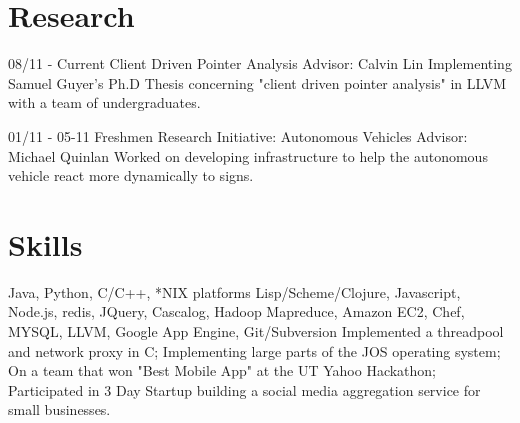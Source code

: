 \documentclass[11pt,letter,sans]{moderncv}
\begin{document}
\section{Research}
\cventry
{08/11 - Current}
{Client Driven Pointer Analysis}
{Advisor: Calvin Lin}
{}
{}
{Implementing Samuel Guyer's Ph.D Thesis concerning "client driven pointer
analysis" in LLVM with a team of undergraduates.}

\cventry
{01/11 - 05-11}
{Freshmen Research Initiative: Autonomous Vehicles}
{Advisor: Michael Quinlan}
{}
{}
{Worked on developing infrastructure to help the autonomous vehicle react more
dynamically to signs.} 

\section{Skills}
{Java, Python, C/C++, *NIX platforms}
{Lisp/Scheme/Clojure, Javascript, Node.js, redis, JQuery, Cascalog, Hadoop Mapreduce,
Amazon EC2, Chef, MYSQL, LLVM, Google App Engine, Git/Subversion }
{Implemented a threadpool and network proxy in C; Implementing large parts of
  the JOS operating system; On a team that won "Best Mobile App" at the UT
  Yahoo Hackathon; Participated in 3 Day Startup building a social media
aggregation service for small businesses.}
\end{document}
